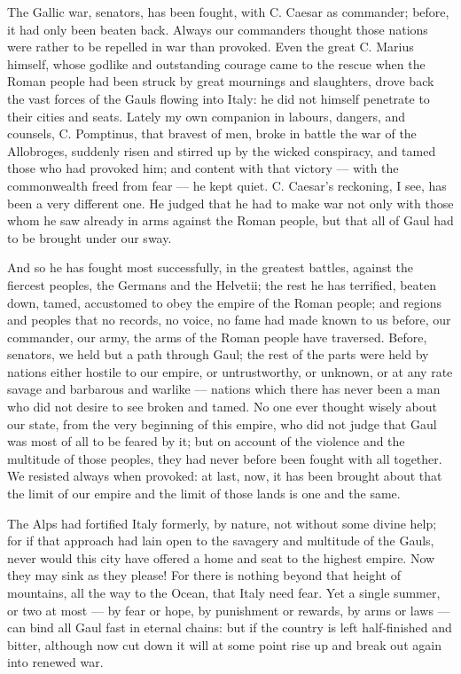  The Gallic war, senators, has been fought, with C. Caesar as commander; before, it had only been beaten back. Always our commanders thought those nations were rather to be repelled in war than provoked. Even the great C. Marius himself, whose godlike and outstanding courage came to the rescue when the Roman people had been struck by great mournings and slaughters, drove back the vast forces of the Gauls flowing into Italy: he did not himself penetrate to their cities and seats. Lately my own companion in labours, dangers, and counsels, C. Pomptinus, that bravest of men, broke in battle the war of the Allobroges, suddenly risen and stirred up by the wicked conspiracy, and tamed those who had provoked him; and content with that victory --- with the commonwealth freed from fear --- he kept quiet. C. Caesar's reckoning, I see, has been a very different one. He judged that he had to make war not only with those whom he saw already in arms against the Roman people, but that all of Gaul had to be brought under our sway.

 And so he has fought most successfully, in the greatest battles, against the fiercest peoples, the Germans and the Helvetii; the rest he has terrified, beaten down, tamed, accustomed to obey the empire of the Roman people; and regions and peoples that no records, no voice, no fame had made known to us before, our commander, our army, the arms of the Roman people have traversed. Before, senators, we held but a path through Gaul; the rest of the parts were held by nations either hostile to our empire, or untrustworthy, or unknown, or at any rate savage and barbarous and warlike --- nations which there has never been a man who did not desire to see broken and tamed. No one ever thought wisely about our state, from the very beginning of this empire, who did not judge that Gaul was most of all to be feared by it; but on account of the violence and the multitude of those peoples, they had never before been fought with all together. We resisted always when provoked: at last, now, it has been brought about that the limit of our empire and the limit of those lands is one and the same.

 The Alps had fortified Italy formerly, by nature, not without some divine help; for if that approach had lain open to the savagery and multitude of the Gauls, never would this city have offered a home and seat to the highest empire. Now they may sink as they please! For there is nothing beyond that height of mountains, all the way to the Ocean, that Italy need fear. Yet a single summer, or two at most --- by fear or hope, by punishment or rewards, by arms or laws --- can bind all Gaul fast in eternal chains: but if the country is left half-finished and bitter, although now cut down it will at some point rise up and break out again into renewed war.

